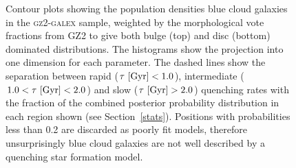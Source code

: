 \begin{figure}
\caption[Population densities of blue smooth and disc galaxies]{Contour plots showing the population densities blue cloud galaxies in the \textsc{gz2-galex} sample, weighted by the morphological vote fractions from GZ2 to give both bulge (top) and disc (bottom) dominated distributions. The histograms show the projection into one dimension for each parameter. The dashed lines show the separation between rapid ($\tau ~\rm{[Gyr]} < 1.0$), intermediate ($1.0 < \tau ~\rm{[Gyr]} < 2.0$) and slow ($\tau ~\rm{[Gyr]} > 2.0$) quenching rates with the fraction of the combined posterior probability distribution in each region shown (see Section~\ref{stats}). Positions with probabilities less than 0.2 are discarded as poorly fit models, therefore unsurprisingly blue cloud galaxies are not well described by a quenching star formation model. }
\label{blue_c}
\end{figure}

